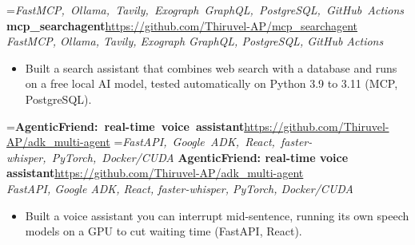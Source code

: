 \documentclass[a4paper,11pt]{article}
\newcommand{\project}[3]{%
  \textbf{#1}\hfill#3\\ {\color{muted}\small\textit{#2}}\par}
\newcommand{\gap}{\vspace{5pt}}
\begin{document}
=\hbox{{\small\textit{FastMCP, Ollama, Tavily, Exograph GraphQL, PostgreSQL, GitHub Actions}}}%
\ifdim\wd0>\linewidth
\ifdim\wd2>\linewidth
\textbf{mcp\_searchagent}\\ {\color{muted}\small\textit{FastMCP, Ollama, Tavily, Exograph GraphQL, PostgreSQL, GitHub Actions}}\\ \hspace*{\fill}{\small\url{https://github.com/Thiruvel-AP/mcp_searchagent}}\par
\else
\textbf{mcp\_searchagent}\\ {\color{muted}\small\textit{FastMCP, Ollama, Tavily, Exograph GraphQL, PostgreSQL, GitHub Actions}}\hfill{\small\url{https://github.com/Thiruvel-AP/mcp_searchagent}}\par
\fi
\else
\project{mcp\_searchagent}{FastMCP, Ollama, Tavily, Exograph GraphQL, PostgreSQL, GitHub Actions}{\url{https://github.com/Thiruvel-AP/mcp_searchagent}}
\fi
\begin{itemize}
  \item Built a search assistant that combines web search with a database and runs on a free local AI model, tested automatically on Python 3.9 to 3.11 (MCP, PostgreSQL).
\end{itemize}
\gap
{}
=\hbox{\textbf{AgenticFriend: real-time voice assistant}\hspace{1em}\url{https://github.com/Thiruvel-AP/adk_multi-agent}}%
=\hbox{{\small\textit{FastAPI, Google ADK, React, faster-whisper, PyTorch, Docker/CUDA}}}%
\ifdim\wd0>\linewidth
\ifdim\wd2>\linewidth
\textbf{AgenticFriend: real-time voice assistant}\\ {\color{muted}\small\textit{FastAPI, Google ADK, React, faster-whisper, PyTorch, Docker/CUDA}}\\ \hspace*{\fill}{\small\url{https://github.com/Thiruvel-AP/adk_multi-agent}}\par
\else
\textbf{AgenticFriend: real-time voice assistant}\\ {\color{muted}\small\textit{FastAPI, Google ADK, React, faster-whisper, PyTorch, Docker/CUDA}}\hfill{\small\url{https://github.com/Thiruvel-AP/adk_multi-agent}}\par
\fi
\else
\project{AgenticFriend: real-time voice assistant}{FastAPI, Google ADK, React, faster-whisper, PyTorch, Docker/CUDA}{\url{https://github.com/Thiruvel-AP/adk_multi-agent}}
\fi
\begin{itemize}
  \item Built a voice assistant you can interrupt mid-sentence, running its own speech models on a GPU to cut waiting time (FastAPI, React).
\end{itemize}
\end{document}
